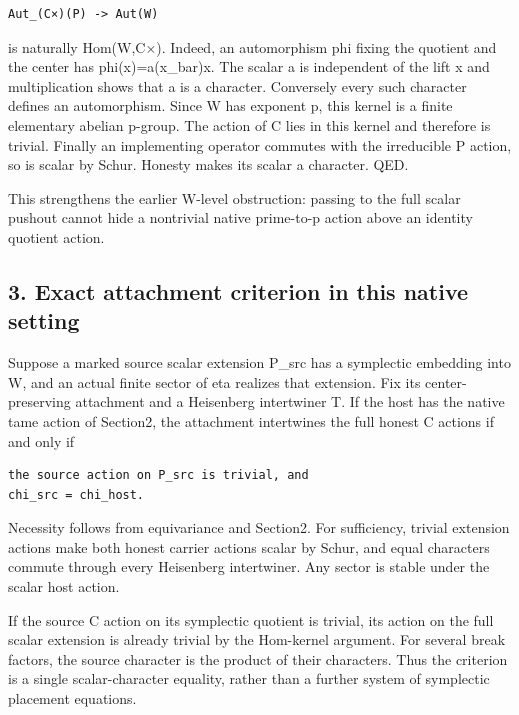 \begin{Verbatim}[fontsize=\small,breaklines=true,breakanywhere=true]
Aut_(C×)(P) -> Aut(W)
\end{Verbatim}

is naturally Hom(W,C×). Indeed, an automorphism phi fixing the quotient
and the center has phi(x)=a(x\_bar)x. The scalar a is independent of the
lift x and multiplication shows that a is a character. Conversely every
such character defines an automorphism. Since W has exponent p, this
kernel is a finite elementary abelian p-group. The action of C lies in
this kernel and therefore is trivial. Finally an implementing operator
commutes with the irreducible P action, so is scalar by Schur. Honesty
makes its scalar a character. QED.

This strengthens the earlier W-level obstruction: passing to the full
scalar pushout cannot hide a nontrivial native prime-to-p action above
an identity quotient action.

\hypertarget{stabilizer_contract-exact-attachment-criterion-in-this-native-setting}{%
\subsection{3. Exact attachment criterion in this native
setting}\label{stabilizer_contract-exact-attachment-criterion-in-this-native-setting}}

Suppose a marked source scalar extension P\_src has a symplectic
embedding into W, and an actual finite sector of eta realizes that
extension. Fix its center-preserving attachment and a Heisenberg
intertwiner T. If the host has the native tame action of Section2, the
attachment intertwines the full honest C actions if and only if

\begin{Verbatim}[fontsize=\small,breaklines=true,breakanywhere=true]
the source action on P_src is trivial, and
chi_src = chi_host.
\end{Verbatim}

Necessity follows from equivariance and Section2. For sufficiency,
trivial extension actions make both honest carrier actions scalar by
Schur, and equal characters commute through every Heisenberg
intertwiner. Any sector is stable under the scalar host action.

If the source C action on its symplectic quotient is trivial, its action
on the full scalar extension is already trivial by the Hom-kernel
argument. For several break factors, the source character is the product
of their characters. Thus the criterion is a single scalar-character
equality, rather than a further system of symplectic placement
equations.

